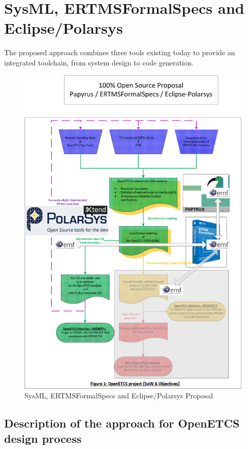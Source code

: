 \chapter{SysML, ERTMSFormalSpecs and Eclipse/Polarsys}
\label{sec:sysML-EFS}

The proposed approach combines three tools existing today to provide an integrated toolchain, from system design 
to code generation.

\begin{figure}
	\centering
		\includegraphics[width=1.10\textwidth]{images/ERTMSSolutionsAlt_1.png}
		\caption{SysML, ERTMSFormalSpecs and Eclipse/Polarsys Proposal}
	\label{fig:ERTMSSolutionsAlt_1}
\end{figure}

\section{Description of the approach for OpenETCS design process}

